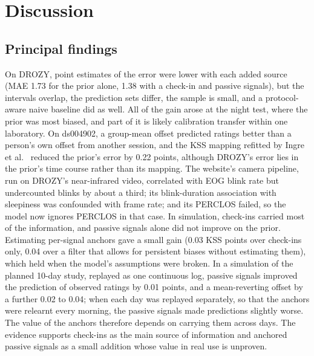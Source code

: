 \section{Discussion}
\label{sec:discussion}

\subsection{Principal findings}
On DROZY, point estimates of the error were lower with each added source (MAE 1.73 for the prior alone, 1.38 with a check-in and passive signals), but the intervals overlap, the prediction sets differ, the sample is small, and a protocol-aware naive baseline did as well. All of the gain arose at the night test, where the prior was most biased, and part of it is likely calibration transfer within one laboratory. On ds004902, a group-mean offset predicted ratings better than a person's own offset from another session, and the KSS mapping refitted by Ingre et al.~\cite{ingre2014validating} reduced the prior's error by 0.22 points, although DROZY's error lies in the prior's time course rather than its mapping. The website's camera pipeline, run on DROZY's near-infrared video, correlated with EOG blink rate but undercounted blinks by about a third; its blink-duration association with sleepiness was confounded with frame rate; and its PERCLOS failed, so the model now ignores PERCLOS in that case. In simulation, check-ins carried most of the information, and passive signals alone did not improve on the prior. Estimating per-signal anchors gave a small gain (0.03 KSS points over check-ins only, 0.04 over a filter that allows for persistent biases without estimating them), which held when the model's assumptions were broken. In a simulation of the planned 10-day study, replayed as one continuous log, passive signals improved the prediction of observed ratings by 0.01 points, and a mean-reverting offset by a further 0.02 to 0.04; when each day was replayed separately, so that the anchors were relearnt every morning, the passive signals made predictions slightly worse. The value of the anchors therefore depends on carrying them across days. The evidence supports check-ins as the main source of information and anchored passive signals as a small addition whose value in real use is unproven.

